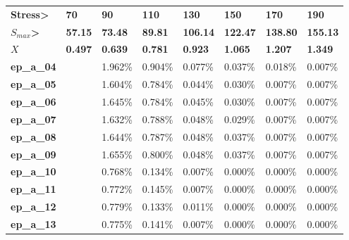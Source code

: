 \documentclass[3p,times,number,review]{elsarticle}
\begin{document}
\begin{table}[!h]
	\centering
	\begin{tabular}{llllllll}
		\hline
		\textbf{Stress\textgreater}  & \textbf{70}    & \textbf{90}    & \textbf{110}   & \textbf{130}    & \textbf{150}    & \textbf{170}    & \textbf{190}    \\
		\textbf{$S_{max}$\textgreater} & \textbf{57.15} & \textbf{73.48} & \textbf{89.81} & \textbf{106.14} & \textbf{122.47} & \textbf{138.80} & \textbf{155.13} \\
		\textbf{$X$}                 & \textbf{0.497} & \textbf{0.639} & \textbf{0.781} & \textbf{0.923}  & \textbf{1.065}  & \textbf{1.207}  & \textbf{1.349}  \\ \hline
		\textbf{ep\_a\_04}           &                & 1.962\%        & 0.904\%        & 0.077\%         & 0.037\%         & 0.018\%         & 0.007\%         \\
		\textbf{ep\_a\_05}           &                & 1.604\%        & 0.784\%        & 0.044\%         & 0.030\%         & 0.007\%         & 0.007\%         \\
		\textbf{ep\_a\_06}           &                & 1.645\%        & 0.784\%        & 0.045\%         & 0.030\%         & 0.007\%         & 0.007\%         \\
		\textbf{ep\_a\_07}           &                & 1.632\%        & 0.788\%        & 0.048\%         & 0.029\%         & 0.007\%         & 0.007\%         \\
		\textbf{ep\_a\_08}           &                & 1.644\%        & 0.787\%        & 0.048\%         & 0.037\%         & 0.007\%         & 0.007\%         \\
		\textbf{ep\_a\_09}           &                & 1.655\%        & 0.800\%        & 0.048\%         & 0.037\%         & 0.007\%         & 0.007\%         \\
		\textbf{ep\_a\_10}           &                & 0.768\%        & 0.134\%        & 0.007\%         & 0.000\%         & 0.000\%         & 0.000\%         \\
		\textbf{ep\_a\_11}           &                & 0.772\%        & 0.145\%        & 0.007\%         & 0.000\%         & 0.000\%         & 0.000\%         \\
		\textbf{ep\_a\_12}           &                & 0.779\%        & 0.133\%        & 0.011\%         & 0.000\%         & 0.000\%         & 0.000\%         \\
		\textbf{ep\_a\_13}           &                & 0.775\%        & 0.141\%        & 0.007\%         & 0.000\%         & 0.000\%         & 0.000\%         \\ \hline

\end{tabular}
\end{table}
\end{document}
